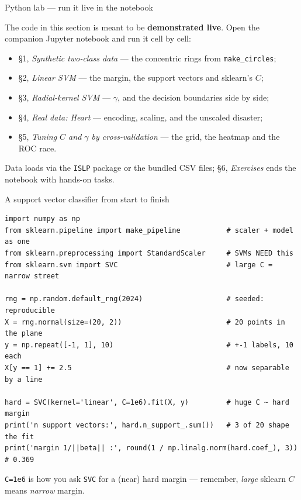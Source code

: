 \documentclass[aspectratio=169,11pt]{beamer}
\begin{document}
\begin{frame}{Python lab --- run it live in the notebook}
  \begin{labnote}
    The code in this section is meant to be \textbf{demonstrated live}. Open
    the companion Jupyter notebook and run it cell by cell:
    \begin{itemize}
      \item \S1, \emph{Synthetic two-class data} --- the concentric rings from
            \texttt{make\_circles};
      \item \S2, \emph{Linear SVM} --- the margin, the support vectors and
            sklearn's $C$;
      \item \S3, \emph{Radial-kernel SVM} --- $\gamma$, and the decision
            boundaries side by side;
      \item \S4, \emph{Real data: Heart} --- encoding, scaling, and the
            unscaled disaster;
      \item \S5, \emph{Tuning $C$ and $\gamma$ by cross-validation} --- the
            grid, the heatmap and the ROC race.
    \end{itemize}
    Data loads via the \texttt{ISLP} package or the bundled CSV files;
    \S6, \emph{Exercises} ends the notebook with hands-on tasks.
  \end{labnote}
\end{frame}

\begin{frame}[fragile]{A support vector classifier from start to finish}
  \begin{lstlisting}[basicstyle=\ttfamily\scriptsize]
import numpy as np
from sklearn.pipeline import make_pipeline           # scaler + model as one
from sklearn.preprocessing import StandardScaler     # SVMs NEED this
from sklearn.svm import SVC                          # large C = narrow street

rng = np.random.default_rng(2024)                    # seeded: reproducible
X = rng.normal(size=(20, 2))                         # 20 points in the plane
y = np.repeat([-1, 1], 10)                           # +-1 labels, 10 each
X[y == 1] += 2.5                                     # now separable by a line

hard = SVC(kernel='linear', C=1e6).fit(X, y)         # huge C ~ hard margin
print('n support vectors:', hard.n_support_.sum())   # 3 of 20 shape the fit
print('margin 1/||beta|| :', round(1 / np.linalg.norm(hard.coef_), 3))  # 0.369
  \end{lstlisting}
  \begin{takeaway}
    \texttt{C=1e6} is how you ask \texttt{SVC} for a (near) hard margin ---
    remember, \emph{large} sklearn $C$ means \emph{narrow} margin.
  \end{takeaway}
\end{frame}
\end{document}
